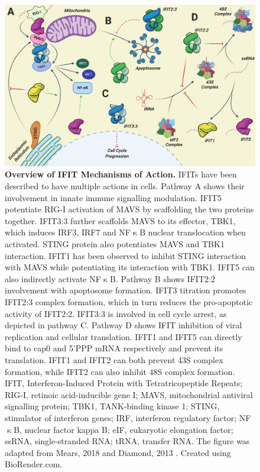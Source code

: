 \begin{figure}
    \centering
    \includegraphics[width=1\linewidth]{04. Introduction//Figs/06. IFIT Mechanism of Action.png}
    \caption[Overview of IFIT Mechanisms of Action.]{\textbf{Overview of IFIT Mechanisms of Action.} IFITs have been described to have multiple actions in cells. Pathway A shows their involvement in innate immune signalling modulation. IFIT5 potentiate RIG-I activation of MAVS by scaffolding the two proteins together. IFIT3:3 further scaffolds MAVS to its effector, TBK1, which induces IRF3, IRF7 and NF$\upkappa$B nuclear translocation when activated. STING protein also potentiates MAVS and TBK1 interaction. IFIT1 has been observed to inhibit STING interaction with MAVS while potentiating its interaction with TBK1. IFIT5 can also indirectly activate NF$\upkappa$B. Pathway B shows IFIT2:2 involvement with apoptosome formation. IFIT3 titration promotes IFIT2:3 complex formation, which in turn reduces the pro-apoptotic activity of IFIT2:2. IFIT3:3 is involved in cell cycle arrest, as depicted in pathway C. Pathway D shows IFIT inhibition of viral replication and cellular translation. IFIT1 and IFIT5 can directly bind to cap0 and 5’PPP mRNA respectively and prevent its translation. IFIT1 and IFIT2 can both prevent 43S complex formation, while IFIT2 can also inhibit 48S complex formation. IFIT, Interferon-Induced Protein with Tetratricopeptide Repeats; RIG-I, retinoic acid-inducible gene I; MAVS, mitochondrial antiviral signalling protein; TBK1, TANK-binding kinase 1; STING, stimulator of interferon genes; IRF, interferon regulatory factor; NF$\upkappa$B, nuclear factor kappa B; eIF, eukaryotic elongation factor; ssRNA, single-stranded RNA; tRNA, transfer RNA. The figure was adapted from Mears, 2018 \cite{Mears2018BetterResponse} and Diamond, 2013 \cite{Diamond2013TheProteins}. Created using BioRender.com.}
    \label{fig:Overview of IFIT Mechanisms of Action}
\end{figure}

